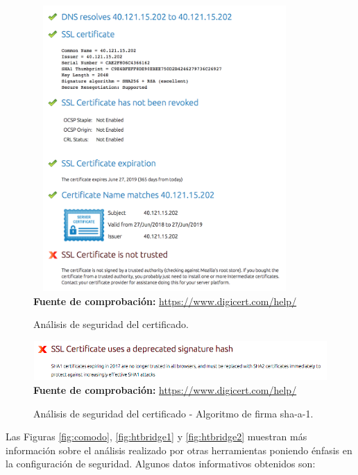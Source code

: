 \documentclass[12pt,a4paper, twoside]{report}
\begin{document}
		\newpage
		
		\begin{figure}[!ht]   
			\caption{Análisis de seguridad del certificado.} 
			\begin{center} 
	 			\includegraphics[width=10cm,height=10.9cm]{Images/implement/digicert} \\
				\label{fig:digicert} 
				\textbf{Fuente de comprobación:} \url{https://www.digicert.com/help/}
			\end{center}  
		\end{figure}	
			
		\begin{figure}[!ht]   
			\caption{Análisis de seguridad del certificado - Algoritmo de firma \gls{sha-a}-1.} 
			\begin{center} 
	 			\includegraphics[width=16cm,height=1.5cm]{Images/implement/digicert_sha1} \\
				\label{fig:digicert_sha1} 
				\textbf{Fuente de comprobación:} \url{https://www.digicert.com/help/}
			\end{center}  
		\end{figure}	

	Las Figuras \ref{fig:comodo}, \ref{fig:htbridge1} y \ref{fig:htbridge2} muestran más información sobre el análisis realizado por otras herramientas poniendo énfasis en la configuración de seguridad. Algunos datos informativos obtenidos son: 
	
\end{document}
